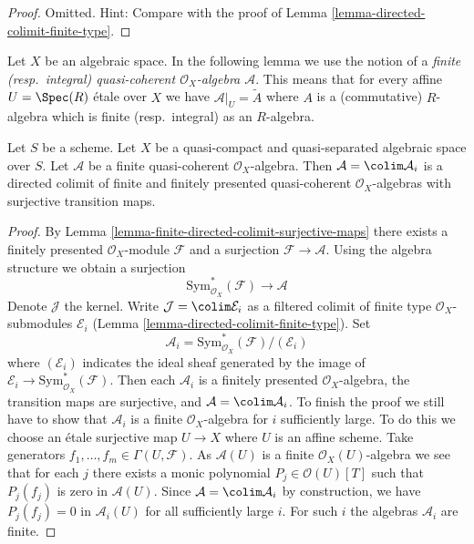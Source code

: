 \begin{proof}
Omitted. Hint: Compare with the proof of
Lemma \ref{lemma-directed-colimit-finite-type}.
\end{proof}

\noindent
Let $X$ be an algebraic space. In the following lemma we use the notion
of a {\it finite (resp.\ integral) quasi-coherent
$\mathcal{O}_X$-algebra $\mathcal{A}$}. This means that for every
affine $U = \Spec(R)$ \'etale over $X$ we have
$\mathcal{A}|_U = \widetilde{A}$ where $A$ is a (commutative) $R$-algebra
which is finite (resp.\ integral) as an $R$-algebra.

\begin{lemma}
\label{lemma-finite-algebra-directed-colimit-finite-finitely-presented}
Let $S$ be a scheme. Let $X$ be a quasi-compact and quasi-separated
algebraic space over $S$. Let $\mathcal{A}$ be a finite quasi-coherent
$\mathcal{O}_X$-algebra. Then $\mathcal{A} = \colim \mathcal{A}_i$
is a directed colimit of finite and finitely presented quasi-coherent
$\mathcal{O}_X$-algebras with surjective transition maps.
\end{lemma}

\begin{proof}
By Lemma \ref{lemma-finite-directed-colimit-surjective-maps}
there exists a finitely presented $\mathcal{O}_X$-module
$\mathcal{F}$ and a surjection $\mathcal{F} \to \mathcal{A}$.
Using the algebra structure we obtain a surjection
$$
\text{Sym}^*_{\mathcal{O}_X}(\mathcal{F}) \longrightarrow \mathcal{A}
$$
Denote $\mathcal{J}$ the kernel. Write $\mathcal{J} = \colim \mathcal{E}_i$
as a filtered colimit of finite type $\mathcal{O}_X$-submodules
$\mathcal{E}_i$ (Lemma \ref{lemma-directed-colimit-finite-type}). Set
$$
\mathcal{A}_i = \text{Sym}^*_{\mathcal{O}_X}(\mathcal{F})/(\mathcal{E}_i)
$$
where $(\mathcal{E}_i)$ indicates the ideal sheaf generated by
the image of $\mathcal{E}_i \to \text{Sym}^*_{\mathcal{O}_X}(\mathcal{F})$.
Then each $\mathcal{A}_i$ is a finitely presented $\mathcal{O}_X$-algebra,
the transition maps are surjective, and $\mathcal{A} = \colim \mathcal{A}_i$.
To finish the proof we still
have to show that $\mathcal{A}_i$ is a finite $\mathcal{O}_X$-algebra
for $i$ sufficiently large. To do this we choose an \'etale surjective
map $U \to X$ where $U$ is an affine scheme. Take generators
$f_1, \ldots, f_m \in \Gamma(U, \mathcal{F})$.
As $\mathcal{A}(U)$ is a finite $\mathcal{O}_X(U)$-algebra we
see that for each $j$ there exists a monic polynomial
$P_j \in \mathcal{O}(U)[T]$ such that $P_j(f_j)$ is zero in $\mathcal{A}(U)$.
Since $\mathcal{A} = \colim \mathcal{A}_i$ by construction, we
have $P_j(f_j) = 0$ in $\mathcal{A}_i(U)$ for all sufficiently large $i$.
For such $i$ the algebras $\mathcal{A}_i$ are finite.
\end{proof}

